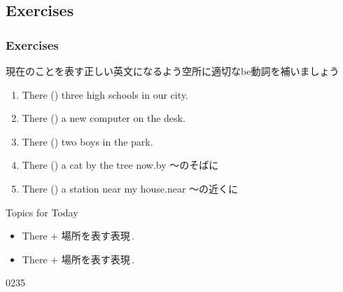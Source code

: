 \documentclass[aspectratio=169,xcolor={dvipsnames,table}]{beamer}
\newcommand{\myaudio}[1]{\href{#1}{\faVolumeUp}}
\begin{document}
\subsection{Exercises}
\begin{frame}[plain]\frametitle{Exercises}

{\small 現在のことを表す正しい英文になるよう空所に適切なbe動詞を補いましょう
  \begin{enumerate}
   \item<2-> There () three high schools in our city.
   \item<4->  There () a new computer on the desk.
   \item<6-> There () two boys in the park.
   \item<8-> There () a cat by the tree now.\hfill{\scriptsize by ～のそばに}
   \item<10-> There () a station near my house.\hfill{\scriptsize near ～の近くに}
  \end{enumerate}

\begin{block}{Topics for Today}
\begin{itemize}[square]
 \item There  $+$ 場所を表す表現\,.
 \item There  $+$ 場所を表す表現\,.
\end{itemize}
\end{block}

\hfill{\tiny 0235}\,{\myaudio{./audio/001_there_is_03.mp3}}}
\end{frame}
\end{document}
